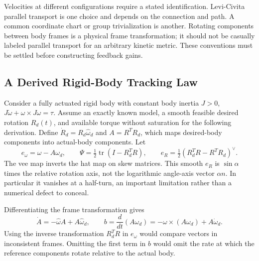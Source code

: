 \documentclass[12pt, openany]{book}
\theoremstyle{plain}
\begin{document}
Velocities at different configurations require a stated identification.
Levi-Civita parallel transport is one choice and depends on the connection
and path. A common coordinate chart or group trivialization is another.
Rotating components between body frames is a physical frame transformation;
it should not be casually labeled parallel transport for an arbitrary kinetic
metric. These conventions must be settled before constructing feedback gains.

\subsection{A Derived Rigid-Body Tracking Law}

Consider a fully actuated rigid body with constant body inertia $J>0$,
$J\dot\omega+\omega\times J\omega=\tau$. Assume an exactly known model,
a smooth feasible desired rotation $R_d(t)$, and available torque without
saturation for the following derivation. Define $\dot R_d=R_d\widehat\omega_d$
and $A=R^TR_d$, which maps desired-body components into actual-body components.
Let
\begin{equation}\label{eq:manifold_attitude_errors}
 e_\omega=\omega-A\omega_d,\qquad
 \Psi=\tfrac12\operatorname{tr}(I-R_d^TR),\qquad
 e_R=\tfrac12(R_d^TR-R^TR_d)^\vee.
\end{equation}
The vee map inverts the hat map on skew matrices. This smooth $e_R$ is
$\sin\alpha$ times the relative rotation axis, not the logarithmic angle-axis
vector $\alpha n$. In particular it vanishes at a half-turn, an important
limitation rather than a numerical defect to conceal.

Differentiating the frame transformation gives
\begin{equation}\label{eq:manifold_attitude_transport}
 \dot A=-\widehat\omega A+A\widehat\omega_d,\qquad
 b=\frac{d}{dt}(A\omega_d)=-\omega\times(A\omega_d)+A\dot\omega_d.
\end{equation}
Using the inverse transformation $R_d^TR$ in $e_\omega$ would compare vectors
in inconsistent frames. Omitting the first term in $b$ would omit the rate
at which the reference components rotate relative to the actual body.
\end{document}
